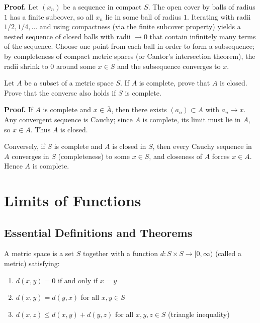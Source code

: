 \noindent\textbf{Proof.}
Let $(x_n)$ be a sequence in compact $S$. The open cover by balls of radius $1$ has a finite subcover, so all $x_n$ lie in some ball of radius $1$. Iterating with radii $1/2,1/4,\dots$ and using compactness (via the finite subcover property) yields a nested sequence of closed balls with radii $\to 0$ that contain infinitely many terms of the sequence. Choose one point from each ball in order to form a subsequence; by completeness of compact metric spaces (or Cantor's intersection theorem), the radii shrink to $0$ around some $x\in S$ and the subsequence converges to $x$.
\medskip

\begin{problembox}
Let $A$ be a subset of a metric space $S$. If $A$ is complete, prove that $A$ is closed. Prove that the converse also holds if $S$ is complete.
\end{problembox}

\noindent\textbf{Proof.}
If $A$ is complete and $x\in\overline{A}$, then there exists $(a_n)\subset A$ with $a_n\to x$. Any convergent sequence is Cauchy; since $A$ is complete, its limit must lie in $A$, so $x\in A$. Thus $A$ is closed.

Conversely, if $S$ is complete and $A$ is closed in $S$, then every Cauchy sequence in $A$ converges in $S$ (completeness) to some $x\in S$, and closeness of $A$ forces $x\in A$. Hence $A$ is complete.
\medskip

\section{Limits of Functions}

\subsection*{Essential Definitions and Theorems}

\begin{definition}
A metric space is a set $S$ together with a function $d: S \times S \to [0,\infty)$ (called a metric) satisfying:
\begin{enumerate}
\item $d(x,y) = 0$ if and only if $x = y$
\item $d(x,y) = d(y,x)$ for all $x,y \in S$
\item $d(x,z) \leq d(x,y) + d(y,z)$ for all $x,y,z \in S$ (triangle inequality)
\end{enumerate}
\end{definition}

